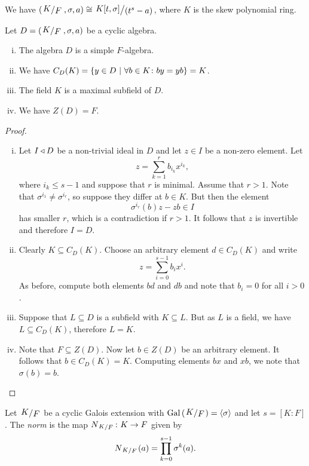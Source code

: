\begin{opomba}
We have
$\br{\kvoc{K}{F}, \sigma, a} \cong \kvoc{K[t, \sigma]}{(t^s - a)}$,
where $K$ is the skew polynomial ring.
\end{opomba}

\begin{izrek}
Let $D = \br{\kvoc{K}{F}, \sigma, a}$ be a cyclic algebra.

\begin{enumerate}[i)]
\item The algebra $D$ is a simple $F$-algebra.
\item We have
$C_D(K) = \left\{y \in D~\middle\vert~\forall b \in K \colon by = yb\right\} = K$.
\item The field $K$ is a maximal subfield of $D$.
\item We have $Z(D) = F$.
\end{enumerate}
\end{izrek}

\begin{proof}
\phantom{a}
\nopagebreak
\begin{enumerate}[i)]
\item Let $I \triangleleft D$ be a non-trivial ideal in $D$ and let
$z \in I$ be a non-zero element. Let
\[
z = \sum_{k=1}^r b_{i_k} x^{i_k},
\]
where $i_k \leq s-1$ and suppose that $r$ is minimal. Assume that
$r > 1$. Note that $\sigma^{i_1} \ne \sigma^{i_r}$, so suppose they
differ at $b \in K$. But then the element
\[
\sigma^{i_r}(b) z - zb \in I
\]
has smaller $r$, which is a contradiction if $r > 1$. It follows
that $z$ is invertible and therefore $I = D$.
\item Clearly $K \subseteq C_D(K)$. Choose an arbitrary element
$d \in C_D(K)$ and write
\[
z = \sum_{i=0}^{s-1} b_i x^i.
\]
As before, compute both elements $bd$ and $db$ and note that
$b_i = 0$ for all $i > 0$.
\item Suppose that $L \subseteq D$ is a subfield with
$K \subseteq L$. But as $L$ is a field, we have
$L \subseteq C_D(K)$, therefore $L = K$.
\item Note that $F \subseteq Z(D)$. Now let $b \in Z(D)$ be an
arbitrary element. It follows that $b \in C_D(K) = K$. Computing
elements $bx$ and $xb$, we note that $\sigma(b) = b$.\qedhere
\end{enumerate}
\end{proof}

\begin{definicija}
Let $\kvoc{K}{F}$ be a cyclic Galois extension with
$\Gal \br{\kvoc{K}{F}} = \skl{\sigma}$ and let $s = [K : F]$. The
\emph{norm} is the map $N_{\kvoc{K}{F}} \colon K \to F$
given by
\[
N_{\kvoc{K}{F}}(a) = \prod_{k=0}^{s-1} \sigma^k(a).
\]
\end{definicija}

